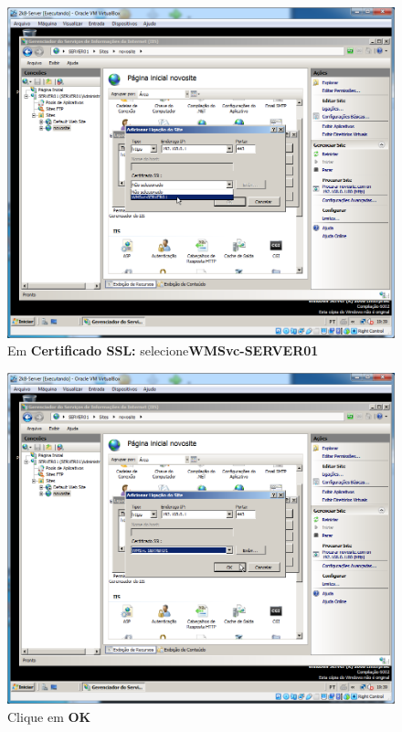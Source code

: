 \documentclass[10pt]{article}
\begin{document}
\begin{figure}[H]
    \centering
    \caption{Em \textbf{Certificado SSL:} selecione\textbf{WMSvc-SERVER01}}
    \label{fig:5532049}
    \includegraphics[width=\linewidth]{images/IIS/criando_um_novo_site/049.png}
\end{figure}
\begin{figure}[H]
    \centering
    \caption{Clique em \textbf{OK}}
    \label{fig:5532050}
    \includegraphics[width=\linewidth]{images/IIS/criando_um_novo_site/050.png}
\end{figure}
\end{document}
